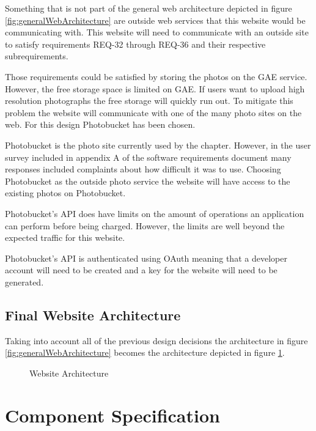 \documentclass{article}
\begin{document}
Something that is not part of the general web architecture depicted in figure \ref{fig:generalWebArchitecture} are outside
web services that this website would be communicating with. This website will need to communicate with an outside site to satisfy requirements REQ-32 through REQ-36 and their respective subrequirements. \cite{schwab_apo_srs_2012}

Those requirements could be satisfied by storing the photos on the GAE service. However, the free storage space is limited
on GAE. If users want to upload high resolution photographs the free storage will quickly run out. To mitigate this problem
the website will communicate with one of the many photo sites on the web. For this design Photobucket has been chosen. \cite{_photobucket_2012}

Photobucket is the photo site currently used by the chapter. However, in the user survey included in appendix A of 
the software requirements document many responses included complaints about how difficult it was to use.\cite{schwab_apo_srs_2012}  Choosing Photobucket as the outside photo service the website will have access to the existing photos on Photobucket.

Photobucket's API does have limits on the amount of operations an application can perform before being charged. \cite{photobucket_method_2010} However, the limits are well beyond the expected traffic for this website.

Photobucket's API is authenticated using OAuth meaning that a developer account will need to be created and a key for the
website will need to be generated. \cite{photobucket_faq_2010}

\subsection{Final Website Architecture}

Taking into account all of the previous design decisions the architecture in figure \ref{fig:generalWebArchitecture}
becomes the architecture depicted in figure \ref{fig:finalWebArchitecture}.

\FloatBarrier
\begin{figure}[h!]

\caption{Website Architecture}
\label{fig:finalWebArchitecture}
\end{figure}
\FloatBarrier

\section{Component Specification}

\newpage


\end{document}
